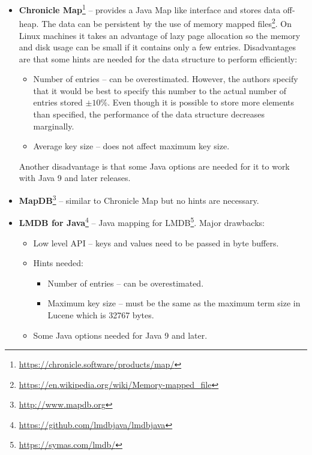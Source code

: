 \begin{itemize}
    \item \textbf{Chronicle Map}\footnote{\url{https://chronicle.software/products/map/}} – provides a Java Map like
    interface and stores data off-heap. The data can be persistent by the use of memory mapped
    files\footnote{\url{https://en.wikipedia.org/wiki/Memory-mapped\_file}}. On Linux machines it takes an advantage
    of lazy page allocation so the memory and disk usage can be small if it contains only a few entries.
    Disadvantages are that some hints are needed for the data structure to perform efficiently:
    \begin{itemize}
        \item Number of entries – can be overestimated. However, the authors specify that it would be best to specify
        this number to the actual number of entries stored $\pm 10\%$. Even though it is possible to store more elements
        than specified, the performance of the data structure decreases marginally.
        \item Average key size – does not affect maximum key size.
    \end{itemize}
    Another disadvantage is that some Java options are needed for it to work with Java 9 and later releases.

    \item \textbf{MapDB}\footnote{\url{http://www.mapdb.org}} – similar to Chronicle Map but no hints are necessary.

    \item \textbf{LMDB for Java}\footnote{\url{https://github.com/lmdbjava/lmdbjava}} – Java mapping for
    LMDB\footnote{\url{https://symas.com/lmdb/}}. Major drawbacks:
    \begin{itemize}
        \item Low level API – keys and values need to be passed in byte buffers.
        \item Hints needed:
            \begin{itemize}
                \item Number of entries – can be overestimated.
                \item Maximum key size – must be the same as the maximum term size in Lucene which is 32767 bytes.
            \end{itemize}
        \item Some Java options needed for Java 9 and later.
    \end{itemize}
\end{itemize}

